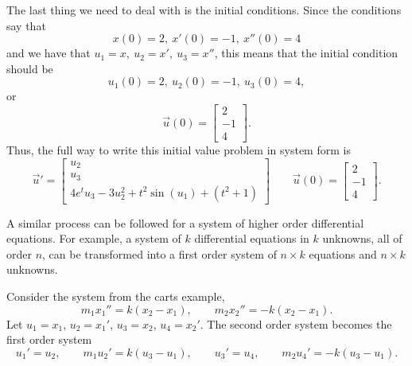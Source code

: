 \documentclass{ximera}
\begin{document}
\begin{exampleSol}
    The last thing we need to deal with is the initial conditions. Since the conditions say that  
    \begin{equation*}
        x(0) = 2,\ x'(0) = -1,\ x''(0) = 4
    \end{equation*}
    and we have that $u_1 = x,\ u_2 = x',\ u_3 = x''$, this means that the initial condition should be 
    \begin{equation*}
        u_1(0) = 2,\ u_2(0) = -1,\ u_3(0) = 4,
    \end{equation*}
    or
    \begin{equation*}
        \vec{u}(0) = 
        \begin{bmatrix} 
            2 \\ 
            -1 \\ 
            4 
        \end{bmatrix}.
    \end{equation*}
    Thus, the full way to write this initial value problem in system form is
    \begin{equation*}
        \vec{u}' = 
        \begin{bmatrix} 
            u_2 \\ 
            u_3 \\  
            4e^tu_3 - 3u_2^2 + t^2\sin(u_1) + (t^2 + 1) 
        \end{bmatrix} 
        \qquad \vec{u}(0) = 
        \begin{bmatrix} 
            2 \\ 
            -1 \\ 
            4 
        \end{bmatrix}.
    \end{equation*}
\end{exampleSol}

A similar process can be followed for a system of higher order differential equations.  For example, a system of $k$ differential equations in $k$ unknowns, all of order $n$, can be transformed into a first order system of $n \times k$ equations and $n \times k$ unknowns.

\begin{example}
    Consider the system from the carts example,
    \begin{equation*}
        m_1 x_1''  = k(x_2-x_1), \qquad m_2 x_2'' = - k(x_2-x_1) .
    \end{equation*}
    Let $u_1 = x_1$, $u_2 = x_1'$, $u_3 = x_2$, $u_4 = x_2'$.  The second order system becomes the first order system
    \begin{equation*}
        u_1' = u_2, \qquad m_1 u_2'  = k(u_3-u_1), \qquad u_3' = u_4, \qquad m_2 u_4' = - k(u_3-u_1) .
    \end{equation*}
\end{example}
\end{document}
